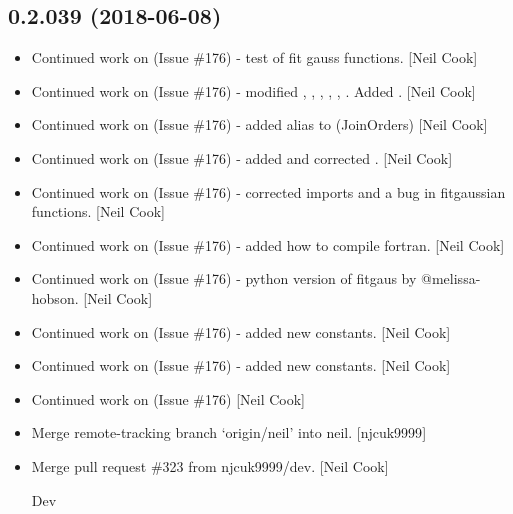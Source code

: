 \documentclass[a4paper,10pt,english]{report}
\begin{document}
\subsection{0.2.039 (2018-06-08)}
\label{\detokenize{misc/changelog:id424}}\begin{itemize}
\item {} 
Continued work on  (Issue \#176) - test of fit gauss functions.
{[}Neil Cook{]}

\item {} 
Continued work on  (Issue \#176) - modified
, , ,
, ,
. Added . {[}Neil Cook{]}

\item {} 
Continued work on  (Issue \#176) - added alias to
 (JoinOrders) {[}Neil Cook{]}

\item {} 
Continued work on  (Issue \#176) - added 
and corrected . {[}Neil Cook{]}

\item {} 
Continued work on  (Issue \#176) - corrected imports and a bug in
fitgaussian functions. {[}Neil Cook{]}

\item {} 
Continued work on  (Issue \#176) - added how to compile fortran.
{[}Neil Cook{]}

\item {} 
Continued work on  (Issue \#176) - python version of fitgaus by
@melissa-hobson. {[}Neil Cook{]}

\item {} 
Continued work on  (Issue \#176) - added new constants. {[}Neil
Cook{]}

\item {} 
Continued work on  (Issue \#176) - added new constants. {[}Neil
Cook{]}

\item {} 
Continued work on  (Issue \#176) {[}Neil Cook{]}

\item {} 
Merge remote-tracking branch ‘origin/neil’ into neil. {[}njcuk9999{]}

\item {} 
Merge pull request \#323 from njcuk9999/dev. {[}Neil Cook{]}

Dev

\end{itemize}
\end{document}
